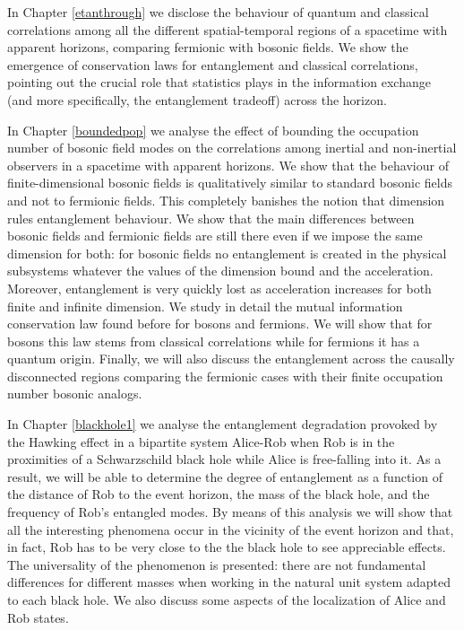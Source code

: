 \begin{list}{}{\leftmargin=1em}
\begin{list}{}{\leftmargin=1em}
\item In Chapter \ref{etanthrough} we  disclose the behaviour of quantum and classical correlations among all the different spatial-temporal regions of a spacetime with apparent horizons, comparing fermionic with bosonic fields. We show the emergence of conservation laws for entanglement and classical correlations, pointing out the crucial role that statistics plays in the information exchange (and more specifically, the entanglement tradeoff) across the horizon. 
\item In Chapter \ref{boundedpop} we analyse the effect of bounding the occupation number of bosonic field modes on the correlations among inertial and non-inertial observers in a spacetime with apparent horizons. We show that the behaviour of finite-dimensional bosonic fields is qualitatively similar to standard bosonic fields and not to fermionic fields. This completely banishes the notion that dimension rules entanglement behaviour. We show that the main differences between bosonic fields and fermionic fields are still there even if we impose the same dimension for both: for bosonic fields no entanglement is created in the physical subsystems whatever the values of the dimension bound and the acceleration. Moreover, entanglement is very quickly lost as acceleration increases for both finite and infinite dimension. We study in detail the mutual information conservation law found before for bosons and fermions. We will show that for bosons this law stems from classical correlations while for fermions it has a quantum origin. Finally, we will also discuss the entanglement across the causally disconnected regions comparing the fermionic cases with their finite occupation number bosonic analogs. 
\item In Chapter \ref{blackhole1} we analyse the entanglement degradation provoked by the Hawking effect in a bipartite system Alice-Rob when Rob is in the proximities of a Schwarzschild black hole while Alice is free-falling into it. As a result, we will be able to determine the degree of entanglement as a function of the distance of Rob to the event horizon, the mass of the black hole, and the frequency of Rob's entangled modes. By means of this analysis we will show that all the interesting phenomena occur in the vicinity of the event horizon and that, in fact,  Rob has to be very close to the the black hole to see appreciable effects. The universality of the phenomenon is presented: there are not fundamental differences for different masses when working in the natural unit system adapted to each black hole. We also discuss some aspects of the localization of Alice and Rob states. 

\end{list}
\end{list}
